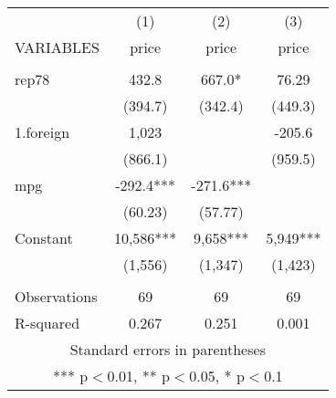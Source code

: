 \documentclass[]{article}
\begin{document}
\begin{tabular}{lccc} \hline
 & (1) & (2) & (3) \\
VARIABLES & price & price & price \\ \hline
 &  &  &  \\
rep78 & 432.8 & 667.0* & 76.29 \\
 & (394.7) & (342.4) & (449.3) \\
1.foreign & 1,023 &  & -205.6 \\
 & (866.1) &  & (959.5) \\
mpg & -292.4*** & -271.6*** &  \\
 & (60.23) & (57.77) &  \\
Constant & 10,586*** & 9,658*** & 5,949*** \\
 & (1,556) & (1,347) & (1,423) \\
 &  &  &  \\
Observations & 69 & 69 & 69 \\
 R-squared & 0.267 & 0.251 & 0.001 \\ \hline
\multicolumn{4}{c}{ Standard errors in parentheses} \\
\multicolumn{4}{c}{ *** p$<$0.01, ** p$<$0.05, * p$<$0.1} \\
\end{tabular}
\end{document}
